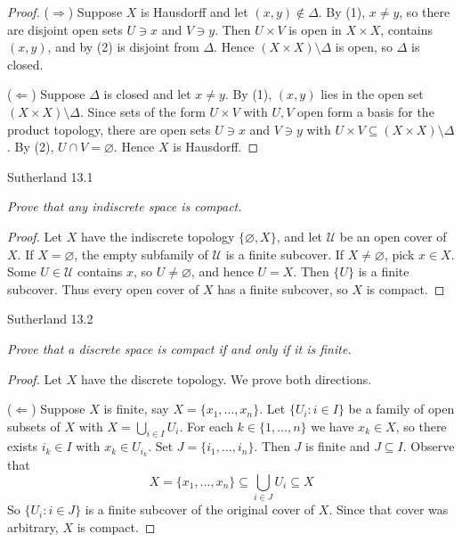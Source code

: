 \documentclass[minion]{homework}
\begin{document}
\begin{problems}
\begin{proof}
($\Rightarrow$) Suppose $X$ is Hausdorff and let $(x, y) \notin \Delta$. By (1), $x \neq y$, so there are disjoint open sets $U \ni x$ and $V \ni y$. Then $U \times V$ is open in $X \times X$, contains $(x, y)$, and by (2) is disjoint from $\Delta$. Hence $(X \times X) \setminus \Delta$ is open, so $\Delta$ is closed.

($\Leftarrow$) Suppose $\Delta$ is closed and let $x \neq y$. By (1), $(x, y)$ lies in the open set $(X \times X) \setminus \Delta$. Since sets of the form $U \times V$ with $U, V$ open form a basis for the product topology, there are open sets $U \ni x$ and $V \ni y$ with $U \times V \subseteq (X \times X) \setminus \Delta$. By (2), $U \cap V = \varnothing$. Hence $X$ is Hausdorff.
\end{proof}

\problem Sutherland 13.1

\textit{Prove that any indiscrete space is compact.}
 
\begin{proof}
Let $X$ have the indiscrete topology $\{\varnothing, X\}$, and let $\mathcal{U}$ be an open cover of $X$. If $X = \varnothing$, the empty subfamily of $\mathcal{U}$ is a finite subcover. If $X \neq \varnothing$, pick $x \in X$. Some $U \in \mathcal{U}$ contains $x$, so $U \neq \varnothing$, and hence $U = X$. Then $\{U\}$ is a finite subcover. Thus every open cover of $X$ has a finite subcover, so $X$ is compact.
\end{proof}


\problem Sutherland 13.2

\textit{Prove that a discrete space is compact if and only if it is finite.}
\newline
\begin{proof}
  Let $X$ have the discrete topology. We prove both directions.

  ($\Leftarrow$) Suppose $X$ is finite, say $X = \{x_1, \dots, x_n\}$. Let $\{U_i : i \in I\}$ be a family of open subsets of $X$ with $X = \bigcup_{i \in I} U_i$.
  For each $k \in \{1, \dots, n\}$ we have $x_k \in X$, so there exists $i_k \in I$ with $x_k \in U_{i_k}$.
  Set $J = \{i_1, \dots, i_n\}$. Then $J$ is finite and $J \subseteq I$. Observe that
  $$X = \{x_1, \dots, x_n\} \subseteq \bigcup_{i \in J} U_i \subseteq X$$
  So $\{U_i : i \in J\}$ is a finite subcover of the original cover of $X$. Since that cover was arbitrary, $X$ is compact.


\end{proof}
\end{problems}
\end{document}
